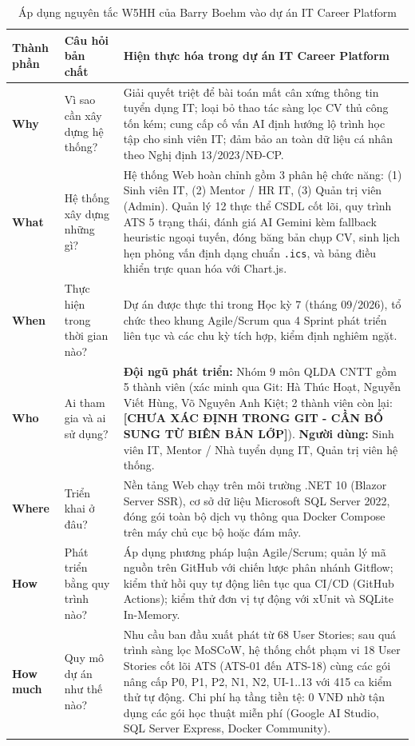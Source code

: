 \begin{table}[htbp]
\centering
\small
\caption{Áp dụng nguyên tắc W5HH của Barry Boehm vào dự án IT Career Platform}
\label{tab:w5hh}
\begin{tabularx}{\textwidth}{l p{3.2cm} X}
\toprule
\textbf{Thành phần} & \textbf{Câu hỏi bản chất} & \textbf{Hiện thực hóa trong dự án IT Career Platform} \\
\midrule
\textbf{Why} & Vì sao cần xây dựng hệ thống? & Giải quyết triệt để bài toán mất cân xứng thông tin tuyển dụng IT; loại bỏ thao tác sàng lọc CV thủ công tốn kém; cung cấp cố vấn AI định hướng lộ trình học tập cho sinh viên IT; đảm bảo an toàn dữ liệu cá nhân theo Nghị định 13/2023/NĐ-CP. \\
\addlinespace
\textbf{What} & Hệ thống xây dựng những gì? & Hệ thống Web hoàn chỉnh gồm 3 phân hệ chức năng: (1) Sinh viên IT, (2) Mentor / HR IT, (3) Quản trị viên (Admin). Quản lý 12 thực thể CSDL cốt lõi, quy trình ATS 5 trạng thái, đánh giá AI Gemini kèm fallback heuristic ngoại tuyến, đóng băng bản chụp CV, sinh lịch hẹn phỏng vấn định dạng chuẩn \texttt{.ics}, và bảng điều khiển trực quan hóa với Chart.js. \\
\addlinespace
\textbf{When} & Thực hiện trong thời gian nào? & Dự án được thực thi trong Học kỳ 7 (tháng 09/2026), tổ chức theo khung Agile/Scrum qua 4 Sprint phát triển liên tục và các chu kỳ tích hợp, kiểm định nghiêm ngặt. \\
\addlinespace
\textbf{Who} & Ai tham gia và ai sử dụng? & \textbf{Đội ngũ phát triển:} Nhóm 9 môn QLDA CNTT gồm 5 thành viên (xác minh qua Git: Hà Thúc Hoạt, Nguyễn Viết Hùng, Võ Nguyên Anh Kiệt; 2 thành viên còn lại: \textbf{[CHƯA XÁC ĐỊNH TRONG GIT - CẦN BỔ SUNG TỪ BIÊN BẢN LỚP]}). \textbf{Người dùng:} Sinh viên IT, Mentor / Nhà tuyển dụng IT, Quản trị viên hệ thống. \\
\addlinespace
\textbf{Where} & Triển khai ở đâu? & Nền tảng Web chạy trên môi trường .NET 10 (Blazor Server SSR), cơ sở dữ liệu Microsoft SQL Server 2022, đóng gói toàn bộ dịch vụ thông qua Docker Compose trên máy chủ cục bộ hoặc đám mây. \\
\addlinespace
\textbf{How} & Phát triển bằng quy trình nào? & Áp dụng phương pháp luận Agile/Scrum; quản lý mã nguồn trên GitHub với chiến lược phân nhánh Gitflow; kiểm thử hồi quy tự động liên tục qua CI/CD (GitHub Actions); kiểm thử đơn vị tự động với xUnit và SQLite In-Memory. \\
\addlinespace
\textbf{How much} & Quy mô dự án như thế nào? & Nhu cầu ban đầu xuất phát từ 68 User Stories; sau quá trình sàng lọc MoSCoW, hệ thống chốt phạm vi 18 User Stories cốt lõi ATS (ATS-01 đến ATS-18) cùng các gói nâng cấp P0, P1, P2, N1, N2, UI-1..13 với 415 ca kiểm thử tự động. Chi phí hạ tầng tiền tệ: 0 VNĐ nhờ tận dụng các gói học thuật miễn phí (Google AI Studio, SQL Server Express, Docker Community). \\
\bottomrule
\end{tabularx}
\end{table}

